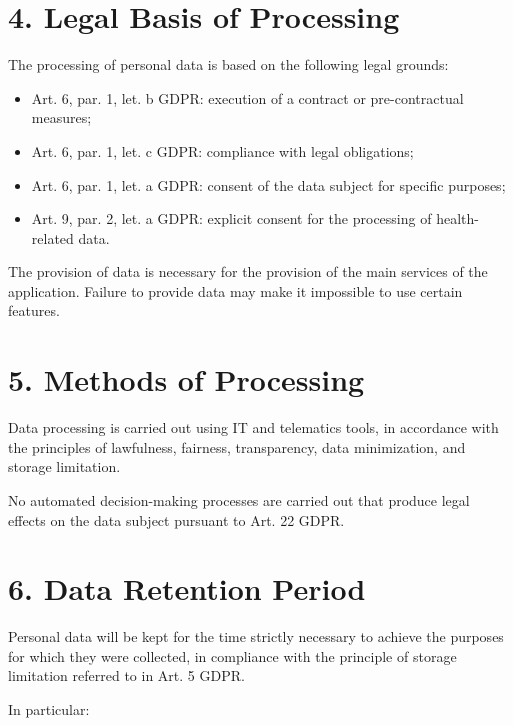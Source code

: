\documentclass[a4paper,12pt]{article}
\begin{document}
    \section*{4. Legal Basis of Processing}

    The processing of personal data is based on the following legal grounds:

    \begin{itemize}
        \item Art. 6, par. 1, let. b GDPR: execution of a contract or pre-contractual measures;
        \item Art. 6, par. 1, let. c GDPR: compliance with legal obligations;
        \item Art. 6, par. 1, let. a GDPR: consent of the data subject for specific purposes;
        \item Art. 9, par. 2, let. a GDPR: explicit consent for the processing of health-related data.
    \end{itemize}

    The provision of data is necessary for the provision of the main services of the application. Failure to provide data may make it impossible to use certain features.

    \section*{5. Methods of Processing}

    Data processing is carried out using IT and telematics tools, in accordance with the principles of lawfulness, fairness, transparency, data minimization, and storage limitation.

    No automated decision-making processes are carried out that produce legal effects on the data subject pursuant to Art. 22 GDPR.

    \section*{6. Data Retention Period}

    Personal data will be kept for the time strictly necessary to achieve the purposes for which they were collected, in compliance with the principle of storage limitation referred to in Art. 5 GDPR.

    In particular:
\end{document}
